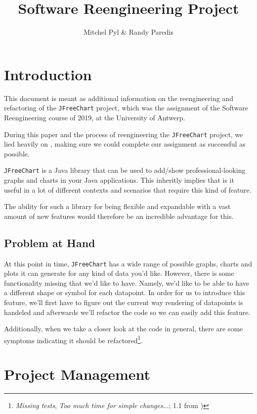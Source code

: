 \documentclass[11pt]{article}
\begin{document}
	\title{Software Reengineering Project}
	\author{Mitchel Pyl \& Randy Paredis}
	\date{}
	
	\maketitle
	
	\section{Introduction}
	This document is meant as additional information on the reengineering and refactoring of the \texttt{JFreeChart} project, which was the assignment of the \textsf{Software Reengineering} course of 2019, at the \textsf{University of Antwerp}.
	
	During this paper and the process of reengineering the \texttt{JFreeChart} project, we lied heavily on \cite{demeyer2009object}, making sure we could complete our assignment as successful as possible.
	
	\texttt{JFreeChart} is a Java library that can be used to add/show professional-looking graphs and charts in your Java applications. This inheritly implies that is it useful in a lot of different contexts and scenarios that require this kind of feature.
	
	The ability for such a library for being flexible and expandable with a vast amount of new features would therefore be an incredible advantage for this.
	
	\subsection{Problem at Hand}
	At this point in time, \texttt{JFreeChart} \cite{jfreechart} has a wide range of possible graphs, charts and plots it can generate for any kind of data you'd like. However, there is some functionality missing that we'd like to have. Namely, we'd like to be able to have a different shape or symbol for each datapoint. In order for us to introduce this feature, we'll first have to figure out the current way rendering of datapoints is handeled and afterwards we'll refactor the code so we can easily add this feature.
	
	Additionally, when we take a closer look at the code in general, there are some symptoms indicating it should be refactored\footnote{\textit{Missing tests}, \textit{Too much time for simple changes}...; 1.1 from \cite{demeyer2009object})}.
	
	\section{Project Management}
\end{document}

